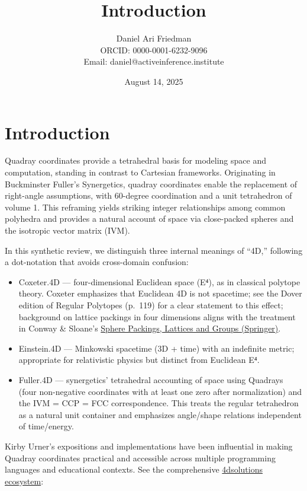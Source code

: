 \documentclass[
]{article}
\title{Introduction}
\author{Daniel Ari Friedman\\ ORCID: 0000-0001-6232-9096\\ Email: daniel@activeinference.institute}
\date{August 14, 2025}
\providecommand{\tightlist}{%
  \setlength{\itemsep}{0pt}\setlength{\parskip}{0pt}}
\begin{document}
\maketitle

\hypertarget{introduction}{%
\section{Introduction}\label{introduction}}

Quadray coordinates provide a tetrahedral basis for modeling space and
computation, standing in contrast to Cartesian frameworks. Originating
in Buckminster Fuller's Synergetics, quadray coordinates enable the
replacement of right-angle assumptions, with 60-degree coordination and
a unit tetrahedron of volume 1. This reframing yields striking integer
relationships among common polyhedra and provides a natural account of
space via close-packed spheres and the isotropic vector matrix (IVM).

In this synthetic review, we distinguish three internal meanings of
``4D,'' following a dot-notation that avoids cross-domain confusion:

\begin{itemize}
\tightlist
\item
  Coxeter.4D --- four-dimensional Euclidean space (E⁴), as in classical
  polytope theory. Coxeter emphasizes that Euclidean 4D is not
  spacetime; see the Dover edition of Regular Polytopes (p.~119) for a
  clear statement to this effect; background on lattice packings in four
  dimensions aligns with the treatment in Conway \& Sloane's
  \href{https://link.springer.com/book/10.1007/978-1-4757-6568-7}{Sphere
  Packings, Lattices and Groups (Springer)}.
\item
  Einstein.4D --- Minkowski spacetime (3D + time) with an indefinite
  metric; appropriate for relativistic physics but distinct from
  Euclidean E⁴.
\item
  Fuller.4D --- synergetics' tetrahedral accounting of space using
  Quadrays (four non-negative coordinates with at least one zero after
  normalization) and the IVM = CCP = FCC correspondence. This treats the
  regular tetrahedron as a natural unit container and emphasizes
  angle/shape relations independent of time/energy.
\end{itemize}

Kirby Urner's expositions and implementations have been influential in
making Quadray coordinates practical and accessible across multiple
programming languages and educational contexts. See the comprehensive
\href{https://github.com/4dsolutions}{4dsolutions ecosystem}:
\end{document}
